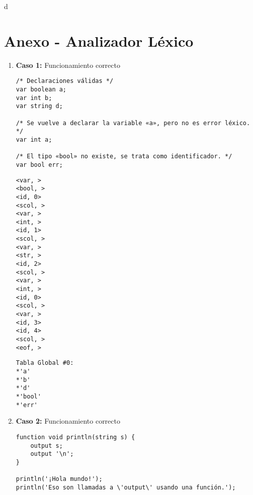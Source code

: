 d \appendix
\section{Anexo - Analizador Léxico}


\begin{enumerate}

    \item \textbf{Caso 1:} Funcionamiento correcto
    \begin{tcolorbox}[title={Código fuente}, colback=white]
        \begin{lstlisting}
/* Declaraciones válidas */
var boolean a;
var int b;
var string d;

/* Se vuelve a declarar la variable «a», pero no es error léxico. */
var int a;

/* El tipo «bool» no existe, se trata como identificador. */
var bool err;
        \end{lstlisting}
    \end{tcolorbox}

    \begin{tcolorbox}[title={Volcado del fichero de tokens}, colback=white]
        \begin{lstlisting}
<var, >
<bool, >
<id, 0>
<scol, >
<var, >
<int, >
<id, 1>
<scol, >
<var, >
<str, >
<id, 2>
<scol, >
<var, >
<int, >
<id, 0>
<scol, >
<var, >
<id, 3>
<id, 4>
<scol, >
<eof, >
        \end{lstlisting}
    \end{tcolorbox}

    \begin{tcolorbox}[title={Volcado del fichero de la tabla de símbolos}, colback=white]
        \begin{lstlisting}
Tabla Global #0:
*'a'
*'b'
*'d'
*'bool'
*'err'
        \end{lstlisting}
    \end{tcolorbox}


    \item \textbf{Caso 2:} Funcionamiento correcto
    \begin{tcolorbox}[title={Código fuente}, colback=white]
        \begin{lstlisting}
function void println(string s) {
    output s;
    output '\n';
}

println('¡Hola mundo!');
println('Eso son llamadas a \'output\' usando una función.');
        \end{lstlisting}
    \end{tcolorbox}


\end{enumerate}
